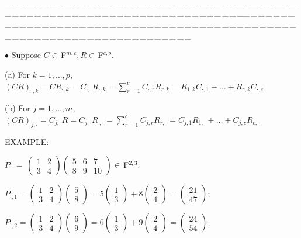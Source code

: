 \documentclass[a4paper, 11pt, UTF8]{article}
\def\Fbfc{$\,{\timesbf F}$}
\begin{document}
\begin{large}
\par
{\tiny \_\,\_\,\_\,\_\,\_\,\_\,\_\,\_\,\_\,\_\,\_\,\_\,\_\,\_\,\_\,\_\,\_\,\_\,\_\,\_\,\_\,\_\,\_\,\_\,\_\,\_\,\_\,\_\,\_\,\_\,\_\,\_\,\_\,\_\,\_\,\_\,\_\,\_\,\_\,\_\,\_\,\_\,\_\,\_\,\_\,\_\,\_\,\_\,\_\,\_\,\_\,\_\,\_\,\_\,\_\,\_\,\_\,\_\,\_\,\_\,\_\,\_\,\_\,\_\,\_\,\_\,\_\,\_\,\_\,\_\,\_\_\,\_\,\_\,\_\,\_\,\_\,\_\,\_\,\_\,\_\,\_\,\_\,\_\,\_\,\_\,\_\,\_\,\_\,\_\,\_\,\_\,\_\,\_\,\_\,\_\,\_\,\_\,\_\,\_\,\_\,\_\,\_\,\_\,\_\,\_\,\_\,\_\,\_\,\_\,\_\,\_\,\_\,\_\,\_\,\_\,\_\,\_\,\_\,\_\,\_\,\_\,\_\,\_\,\_\,\_\,\_\,\_\,\_\,\_\,\_\,\_\,\_\,\_\,\_\,\_\,\_\,\_\,\_\,\_\,\_\,\_}\par
{\small $\bullet$} {\Large\timessl Suppose $C\in\Fbfc^{m,c},R\in\Fbfc^{c,p}$.}\par\quad
(a) For $k=1,\dots,p,$\quad $(CR)_{\cdot,k}=CR_{\cdot,k}=C_{\cdot,\cdot}R_{\cdot,k}=\sum\limits_{r=1}^c C_{\cdot,r}R_{r,k}=R_{1,k}C_{\cdot,1}+\dots+R_{c,k}C_{\cdot,c}$\par\quad
(b) For $j=1,\dots,m,$\quad $(CR)_{j,\cdot}=C_{j,\cdot}R=C_{j,\cdot}R_{\cdot,\cdot}=\sum\limits_{r=1}^c C_{j,r}R_{r,\cdot}=C_{j,1}R_{1,\cdot}+\dots+C_{j,c}R_{c,\cdot}$\par\quad
{\Large E{\normalsize XAMPLE}:}\par\quad
$P\,\,\,=\,\begin{pmatrix} 1 & 2\\ 3 & 4\end{pmatrix}\begin{pmatrix}5 & 6 & 7\\ 8 & 9 & 10\end{pmatrix}\in\Fbfc^{2,3}.$\par\quad
$P_{\cdot,1}=\begin{pmatrix} 1 & 2\\ 3 & 4\end{pmatrix}\begin{pmatrix} 5 \\ 8\end{pmatrix}=5\begin{pmatrix}1\\3\end{pmatrix}+8\begin{pmatrix}2\\4\end{pmatrix}=\begin{pmatrix} 21\\ 47\end{pmatrix}$;
\par\quad
$P_{\cdot,2}=\begin{pmatrix} 1 & 2\\ 3 & 4\end{pmatrix}\begin{pmatrix} 6 \\ 9\end{pmatrix}=6\begin{pmatrix}1\\3\end{pmatrix}+9\begin{pmatrix}2\\4\end{pmatrix}=\begin{pmatrix} 24\\ 54\end{pmatrix}$;

\end{large}
\end{document}
